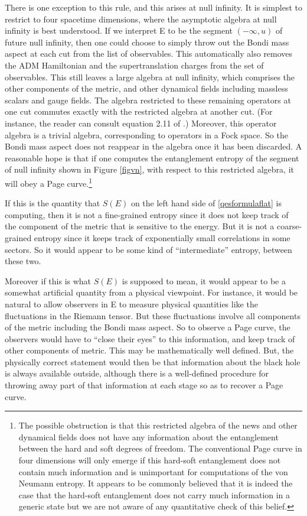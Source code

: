 \documentclass[12pt]{article}
\begin{document}
There is one exception to this rule, and this arises at null infinity. It is simplest to restrict to four spacetime dimensions, where the asymptotic algebra at null infinity is best understood. If we interpret E to be the segment $(-\infty, u)$ of future null infinity, then one could choose to simply throw out the  Bondi mass aspect at each cut from the list of observables. This automatically also removes  the ADM Hamiltonian and the  supertranslation charges from the
set of observables.  This still leaves a large algebra at null infinity, which comprises the other components of the metric, and other dynamical fields including massless scalars and gauge fields. The algebra restricted to these remaining operators at one cut commutes exactly with the restricted algebra  at another cut. (For instance, the reader can consult equation 2.11 of \cite{Laddha:2020kvp}.) Moreover, this operator algebra is a trivial algebra, corresponding to operators in a Fock space. So the Bondi mass aspect does not reappear in the algebra once it has been discarded.   A reasonable hope is that if one computes the entanglement entropy of the segment of null infinity shown in Figure \ref{figvn}, with respect to this restricted algebra, it will obey a Page curve.\footnote{The possible obstruction is that
this restricted algebra of the news and other dynamical fields does not have any information about the entanglement between the hard and soft degrees of freedom. The conventional Page curve in four dimensions will only emerge  if this hard-soft entanglement does not contain much information and is unimportant for computations of the von Neumann entropy. It appears to be commonly believed that it is indeed the case that the hard-soft entanglement does not carry much
information in a generic state but we are not aware of any quantitative check of this belief.}

If this is the quantity that $S(E)$ on the left hand side of \eqref{qesformulaflat} is computing, then it is not a fine-grained entropy since it does not keep track of the component of the metric that is sensitive to the energy. But it is not a coarse-grained entropy since it keeps track of exponentially small correlations in some sectors. So it would appear to be some kind of ``intermediate'' entropy, between these two.

Moreover if this is what $S(E)$ is supposed to mean, it would appear to be a somewhat artificial quantity from a physical viewpoint. For instance, it would be natural to allow observers in E to measure physical quantities like the fluctuations in the Riemann tensor. But these fluctuations involve all components of the metric including the Bondi mass aspect.  So to observe a Page curve, the observers would have to ``close their eyes'' to this information, and keep track of other components  of metric. This may be mathematically well defined. But, the physically correct statement would then be that information about the black hole is always available outside, although there is a well-defined procedure for throwing away part of that information at each stage so as to recover a Page curve.
\end{document}
